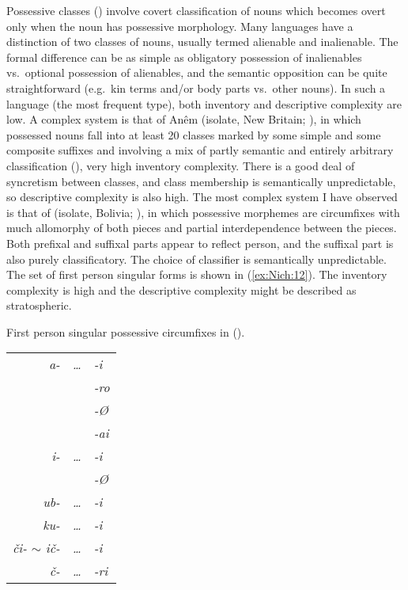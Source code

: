 \documentclass[output=collectionpaper]{langsci/langscibook}
\begin{document}
Possessive classes (\citealt{Nichols2013,Bickel2013a}) involve covert classification of nouns which becomes overt only when the noun has possessive morphology. Many languages have a distinction of two classes of nouns, usually termed alienable and inalienable. The formal difference can be as simple as obligatory possession of inalienables vs.\ optional possession of alienables, and the semantic opposition can be quite straightforward (e.g.\ kin terms and/or body parts vs.\ other nouns). In such a language (the most frequent type), both inventory and descriptive complexity are low. A complex system is that of Anêm (isolate, New Britain; \citealt{Thurston1982}), in which possessed nouns fall into at least 20 classes marked by some simple and some composite suffixes and involving a mix of partly semantic and entirely arbitrary classification (\citealt[37--38]{Thurston1982}), very high inventory complexity. There is a good deal of syncretism between classes, and class membership is semantically unpredictable, so descriptive complexity is also high. The most complex system I have observed is that of  (isolate, Bolivia; \citealt{Key1967}), in which possessive morphemes are circumfixes with much allomorphy of both pieces and partial interdependence between the pieces. Both prefixal and suffixal parts appear to reflect person, and the suffixal part is also purely classificatory. The choice of classifier is semantically unpredictable. The set of first person singular forms is shown in (\ref{ex:Nich:12}). The inventory complexity is high and the descriptive complexity might be described as stratospheric.

\ea
\label{ex:Nich:12}
First person singular possessive circumfixes in  (\citealt{Key1967}). \\
\medskip
\begin{tabular}{>{\itshape}r>{\itshape}l>{\itshape}l}
		a- & \ldots &	-i \\
			& & -ro \\
			& & -Ø	 \\
			 && -ai	 \\
		i-  & \ldots & 	-i	 \\
			 && -Ø	 \\
		ub-  & \ldots &	-i \\
		ku-  & \ldots & 	-i \\
		či- $\sim$ ič- & \ldots & -i		 \\
		č- & \ldots &	-ri	 \\
\end{tabular}
\z
\end{document}
